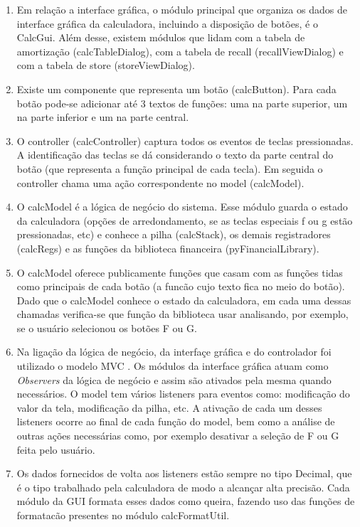 \begin{enumerate}
 \item Em relação a interface gráfica, o módulo principal que organiza os dados de interface gráfica da calculadora, incluindo a disposição de botões, é o CalcGui. Além desse, existem módulos que lidam com a tabela de amortização (calcTableDialog), com a tabela de recall (recallViewDialog) e com a tabela de store (storeViewDialog). 

\item Existe um componente que representa um botão (calcButton). Para cada botão pode-se adicionar até 3 textos de funções: uma na parte superior, um na parte inferior e um na parte central.

\item O controller (calcController) captura todos os eventos de teclas pressionadas. A identificação das teclas se dá considerando o texto da parte central do botão 
(que representa a função principal de cada tecla). Em seguida o controller chama uma ação correspondente no model (calcModel).

\item O calcModel é a lógica de negócio do sistema. Esse módulo guarda o estado da calculadora (opções de arredondamento, se as teclas especiais f ou g estão pressionadas, etc) e conhece a pilha (calcStack), os demais registradores (calcRegs) e as funções da biblioteca financeira (pyFinancialLibrary).

\item O calcModel oferece publicamente funções que casam com as funções tidas como principais de cada botão (a funcão cujo texto fica no meio do botão). Dado que o calcModel conhece o estado da calculadora, em cada uma dessas chamadas verifica-se que função da biblioteca usar analisando, por exemplo, se o usuário selecionou os botões F ou G.

\item Na ligação da lógica de negócio, da interfaçe gráfica e do controlador foi utilizado o modelo MVC \cite {mvc}. Os módulos da interface gráfica atuam como \textit{Observers} da lógica de negócio e assim são ativados pela mesma quando necessários. O model tem vários listeners para eventos como: modificação do valor da tela, modificação da pilha, etc. A ativação de cada um desses listeners ocorre ao final de cada função do model, bem como a análise de outras ações necessárias como, por exemplo desativar a seleção de F ou G feita pelo usuário.

\item Os dados fornecidos de volta aos listeners estão sempre no tipo Decimal, que é o tipo trabalhado pela calculadora de modo a alcançar alta precisão. Cada módulo da GUI formata esses dados como queira, fazendo uso das funções de formatacão presentes no módulo calcFormatUtil.

\end{enumerate}


